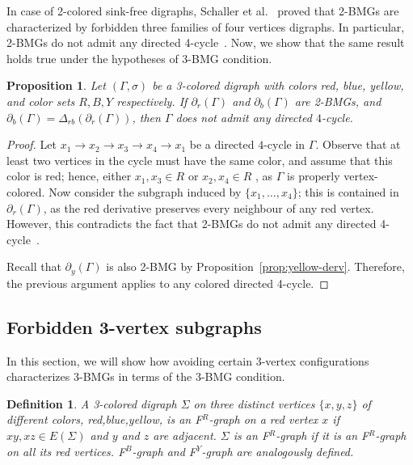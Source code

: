 \documentclass[final,3p,times]{elsarticle}
\newtheorem{proposition}[theorem]{Proposition}%
\newtheorem{definition}{Definition}[section]
\begin{document}
In case of 2-colored sink-free digraphs, Schaller et al.~\cite{schaller2021complexity} proved that 2-BMGs are characterized by forbidden three families of four vertices digraphs. In particular, 2-BMGs do not admit any directed 4-cycle~\cite[Theorem~4.4]{schaller2021complexity}. Now, we show that the same result holds true under the hypotheses of 3-BMG condition.     
\begin{proposition}
Let $(\Gamma,\sigma)$ be a 3-colored digraph with colors red, blue, yellow, and color sets $R,B,Y$ respectively. If $\partial_r(\Gamma)$ and $\partial_b(\Gamma)$ are 2-BMGs, and $\partial_b(\Gamma)=\Delta_{rb}(\partial_r(\Gamma))$, then $\Gamma$ does not admit any directed $4$-cycle.
\end{proposition}
\begin{proof}
Let $x_1\rightarrow x_2\rightarrow x_3 \rightarrow x_4 \rightarrow x_1$ be a directed $4$-cycle in $\Gamma$. Observe that at least two vertices in the cycle must have the same color, and assume that this color is red; hence, either $x_1,x_3\in R$ or $x_2,x_4\in R$ , as $\Gamma$ is properly vertex-colored. Now consider the subgraph induced by $\{x_1,\ldots, x_4\}$; this is contained in $\partial_r(\Gamma)$, as the red derivative preserves every neighbour of any red vertex. However, this contradicts the fact that 2-BMGs do not admit any directed 4-cycle~\cite[Theorem~4.4]{schaller2021complexity}.

Recall that $\partial_y(\Gamma)$ is also 2-BMG by Proposition~\ref{prop:yellow-derv}. Therefore, the previous argument applies to any colored directed 4-cycle.
\end{proof}

\subsection{Forbidden 3-vertex subgraphs}
\label{sec:forbidden_graphs}
In this section, we will show how avoiding certain 3-vertex configurations characterizes 3-BMGs in terms of the 3-BMG condition. 

\begin{definition}
\label{def:color-triangular}
A 3-colored digraph $\Sigma$ on three distinct vertices $\{x,y,z\}$ of different colors, red,blue,yellow, is an \emph{F$^R$-graph on a red vertex} $x$ if $xy,xz\in E(\Sigma)$ and $y$ and $z$ are adjacent. $\Sigma$ is an \emph{F$^R$-graph} if it is an F$^R$-graph on all its red vertices. F$^B$-graph and F$^Y$-graph are analogously defined. 
\end{definition}
\end{document}

